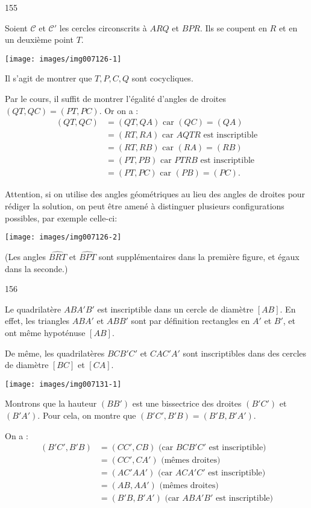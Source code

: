 \begin{Soln}{155}



Soient $\mathcal C$ et $\mathcal C'$ les cercles circonscrits à $ARQ$ et $BPR$.
Ils se coupent en $R$ et en un deuxième point $T$.

\begin{center}
\texttt{[image: images/img007126-1]}
\end{center}

Il s'agit de montrer que $T, P, C, Q$ sont cocycliques.


Par le cours,  il suffit de montrer l'égalité d'angles de droites $(QT,QC)=(PT,PC)$. Or on a :
\begin{align*}
(QT,QC)&=(QT,QA) \text{ car $(QC)=(QA)$}\\
&=(RT,RA) \text{ car $AQTR$ est inscriptible} \\
&= (RT,RB) \text{ car $(RA)=(RB)$} \\
&=(PT,PB) \text{ car $PTRB$ est inscriptible} \\
&=(PT,PC) \text{ car $(PB)=(PC)$.}
\end{align*}

Attention, si on utilise des angles géométriques au lieu des angles de droites pour rédiger la solution, on peut être amené à distinguer plusieurs configurations possibles, par exemple celle-ci:
\begin{center}
\texttt{[image: images/img007126-2]}
\end{center}

(Les angles $\widehat{BRT}$ et $\widehat{BPT}$ sont supplémentaires dans la première figure, et égaux dans la seconde.)

\end{Soln}
\begin{Soln}{156}

Le quadrilatère $ABA'B'$ est inscriptible dans un cercle de diamètre $[AB]$. En effet, les triangles $ABA'$ et $ABB'$ sont par définition rectangles en $A'$ et $B'$, et ont même hypoténuse $[AB]$.

De même, les quadrilatères $BCB'C'$ et $CAC'A'$ sont inscriptibles dans des cercles de diamètre $[BC]$ et $[CA]$.

\begin{center}
\texttt{[image: images/img007131-1]}
\end{center}

Montrons que la hauteur $(BB')$ est une bissectrice des droites $(B'C')$ et $(B'A')$. Pour cela, on montre que $(B'C',B'B)=(B'B,B'A')$.

On a :
\begin{align*}
(B'C',B'B)
&= (CC',CB) \text{ (car $BCB'C'$ est inscriptible)}\\
&= (CC',CA') \text{ (mêmes droites)}\\
&= (AC'AA') \text{ (car $ACA'C'$ est inscriptible)}\\
&= (AB,AA') \text{ (mêmes droites)}\\
&= (B'B,B'A') \text{ (car $ABA'B'$ est inscriptible)}\\
\end{align*}

\end{Soln}
